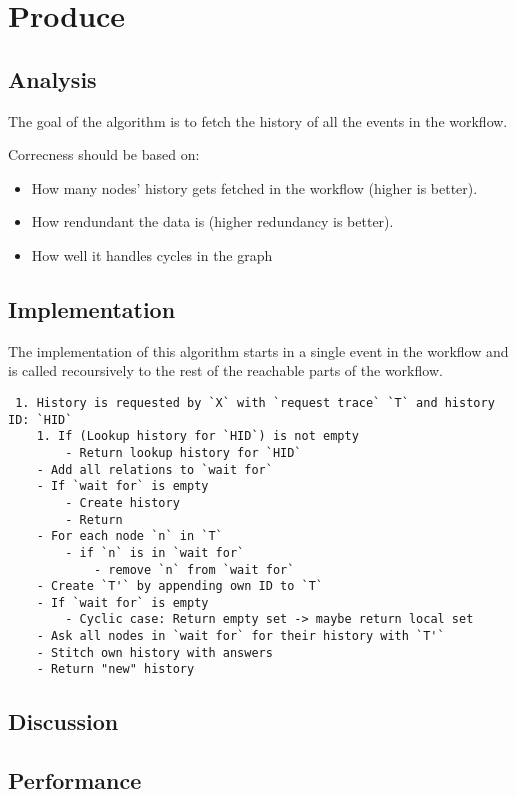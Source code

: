 \section{Produce}
\subsection{Analysis} %
The goal of the algorithm is to fetch the history of all the events in the workflow.

Correcness should be based on:
\begin{itemize}
    \item How many nodes' history gets fetched in the workflow (higher is better).
    \item How rendundant the data is (higher redundancy is better).
    \item How well it handles cycles in the graph
\end{itemize}

\subsection{Implementation} %
The implementation of this algorithm starts in a single event in the workflow and is called recoursively to the rest of the reachable parts of the workflow.

\begin{lstlisting}
 1. History is requested by `X` with `request trace` `T` and history ID: `HID`
    1. If (Lookup history for `HID`) is not empty
        - Return lookup history for `HID`
    - Add all relations to `wait for`
    - If `wait for` is empty
        - Create history
        - Return
    - For each node `n` in `T`
        - if `n` is in `wait for`
            - remove `n` from `wait for`
    - Create `T'` by appending own ID to `T`
    - If `wait for` is empty
        - Cyclic case: Return empty set -> maybe return local set
    - Ask all nodes in `wait for` for their history with `T'`
    - Stitch own history with answers
    - Return "new" history
\end{lstlisting}

\subsection{Discussion} %
\subsection{Performance} %